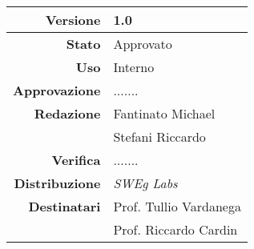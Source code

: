\begin{center}
\begin{tabular}{r|l}
    \textbf{Versione} & 1.0 \\
    \hline
    \textbf{Stato} & Approvato \\
    \hline
    \textbf{Uso} & Interno \\
    \hline
    \textbf{Approvazione} & ....... \\
    \hline
    \textbf{Redazione} & Fantinato Michael \\
                       & Stefani Riccardo \\
    \hline
    \textbf{Verifica} & ....... \\
    \hline
    \textbf{Distribuzione} & \emph{SWEg Labs} \\
    \hline
    \textbf{Destinatari} & Prof. Tullio Vardanega \\
                         & Prof. Riccardo Cardin \\
\end{tabular}
\end{center}

